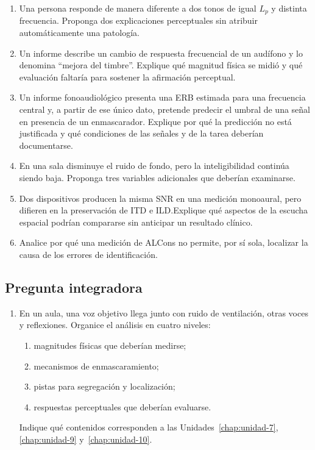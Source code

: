 \begin{enumerate}[label=\textbf{A\arabic*.},leftmargin=*]
    \item Una persona responde de manera diferente a dos tonos de igual
    \(L_p\) y distinta frecuencia. Proponga dos explicaciones perceptuales sin
    atribuir automáticamente una patología.

    \item Un informe describe un cambio de respuesta frecuencial de un
    audífono y lo denomina ``mejora del timbre''. Explique qué magnitud física
    se midió y qué evaluación faltaría para sostener la afirmación perceptual.

    \item Un informe fonoaudiológico presenta una ERB estimada para una
    frecuencia central y, a partir de ese único dato, pretende predecir el
    umbral de una señal en presencia de un enmascarador. Explique por qué la
    predicción no está justificada y qué condiciones de las señales y de la
    tarea deberían documentarse.

    \item En una sala disminuye el ruido de fondo, pero la inteligibilidad
    continúa siendo baja. Proponga tres variables adicionales que deberían
    examinarse.

    \item Dos dispositivos producen la misma SNR en una medición monoaural,
    pero difieren en la preservación de ITD e ILD.\@ Explique qué aspectos de la
    escucha espacial podrían compararse sin anticipar un resultado clínico.

    \item Analice por qué una medición de ALCons no permite, por sí sola,
    localizar la causa de los errores de identificación.
\end{enumerate}

\subsection*{Pregunta integradora}

\begin{enumerate}[label=\textbf{P\arabic*.},leftmargin=*]
    \item En un aula, una voz objetivo llega junto con ruido de ventilación,
    otras voces y reflexiones. Organice el análisis en cuatro niveles:
    \begin{enumerate}
        \item magnitudes físicas que deberían medirse;
        \item mecanismos de enmascaramiento;
        \item pistas para segregación y localización;
        \item respuestas perceptuales que deberían evaluarse.
    \end{enumerate}
    Indique qué contenidos corresponden a las
    Unidades~\ref{chap:unidad-7}, \ref{chap:unidad-9}
    y~\ref{chap:unidad-10}.
\end{enumerate}

